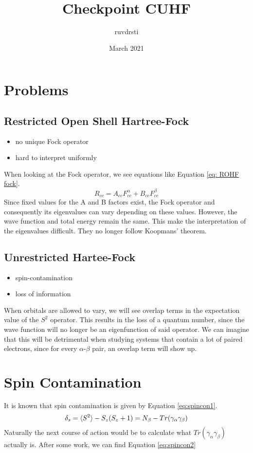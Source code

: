\documentclass{article}
\title{Checkpoint CUHF}
\author{ruvdrsti}
\date{March 2021}
\begin{document}
\maketitle

\section{Problems}
\label{sec:prob}
\subsection{Restricted Open Shell Hartree-Fock}
\label{subsec:ROHF}
\begin{itemize}
    \item no unique Fock operator
    \item hard to interpret uniformly
\end{itemize}
 When looking at the Fock operator, we see equations like Equation \eqref{eq: ROHF fock}.
 \begin{equation}\label{eq: ROHF fock}
     R_{cc} = A_{cc}F^\alpha_{cc} + B_{cc}F^\beta_{cc}
 \end{equation}
 Since fixed values for the A and B factors exist, the Fock operator and consequently its eigenvalues can vary depending on these values. However, the wave function and total energy 
 remain the same. This make the interpretation of the eigenvalues difficult. They no longer follow Koopmans' theorem.
\subsection{Unrestricted Hartee-Fock}
\label{subsec:UHF}
\begin{itemize}
    \item spin-contamination
    \item loss of information
\end{itemize}
When orbitals are allowed to vary, we will see overlap terms in the expectation value of the $S^2$ operator. This results in the loss of a quantum number, since the wave function 
will no longer be an eigenfunction of said operator. We can imagine that this will be detrimental when studying systems that contain a lot of paired electrons, since for 
every $\alpha$-$\beta$ pair, an overlap term will show up.

\section{Spin Contamination}
\label{sec:spincon}
It is known that spin contamination is given by Equation \eqref{eq:spincon1}.
\begin{equation}\label{eq:spincon1}
    \delta_s = \braket{S^2} - S_z(S_z + 1) = N_\beta - Tr(\gamma_\alpha\gamma_\beta)
\end{equation}
Naturally the next course of action would be to calculate what $Tr(\gamma_\alpha\gamma_\beta)$ actually is. After some work, we can find Equation \eqref{eq:spincon2}
\end{document}
